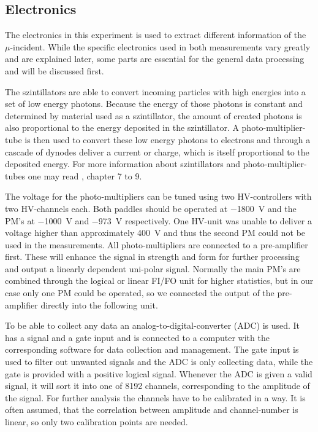 \subsection{Electronics}
	
	The electronics in this experiment is used to extract different information of the $\mu$-incident.
	While the specific electronics used in both measurements vary greatly and are explained later, some parts are essential for the general data processing and will be discussed first.
	
	The szintillators are able to convert incoming particles with high energies into a set of low energy photons.
	Because the energy of those photons is constant and determined by material used as a szintillator, the amount of created photons is also proportional to the energy deposited in the szintillator.
	A photo-multiplier-tube is then used to convert these low energy photons to electrons and through a cascade of dynodes deliver a current or charge, which is itself proportional to the deposited energy.
	For more information about szintillators and photo-multiplier-tubes one may read \cite{leo1994techniques}, chapter 7 to 9.
	
	The voltage for the photo-multipliers can be tuned using two HV-controllers with two HV-channels each.
	Both paddles should be operated at \SI{-1800}{\volt} and the PM's at \SI{-1000}{\volt} and \SI{-973}{\volt} respectively.
	One HV-unit was unable to deliver a voltage higher than approximately \SI{400}{\volt} and thus the second PM could not be used in the measurements.
	All photo-multipliers are connected to a pre-amplifier first.
	These will enhance the signal in strength and form for further processing and output a linearly dependent uni-polar signal.
	Normally the main PM's are combined through the logical or linear FI/FO unit for higher statistics, but in our case only one PM could be operated, so we connected the output of the pre-amplifier directly into the following unit.
	
	To be able to collect any data an analog-to-digital-converter (ADC) is used.
	It has a signal and a gate input and is connected to a computer with the corresponding software for data collection and management.
	The gate input is used to filter out unwanted signals and the ADC is only collecting data, while the gate is provided with a positive logical signal.
	Whenever the ADC is given a valid signal, it will sort it into one of 8192 channels, corresponding to the amplitude of the signal.
	For further analysis the channels have to be calibrated in a way.
	It is often assumed, that the correlation between amplitude and channel-number is linear, so only two calibration points are needed.
	

